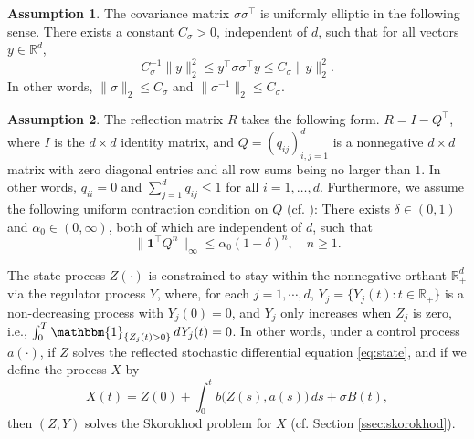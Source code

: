 \documentclass[11pt]{article}
\theoremstyle{definition}
\newtheorem{assumption}{Assumption}[section]
\theoremstyle{plain}
\newcommand{\R}{\mathbb{R}}
\newcommand{\bOne}{\bm{1}}
\begin{document}
\begin{assumption}\label{as:sigma} %
The covariance matrix $\sigma \sigma^{\top}$ is uniformly elliptic in the following sense.  
There exists a constant $C_\sigma > 0$, 
independent of $d$, such that for all vectors $y \in \mathbb{R}^d$,
\[
 C_\sigma^{-1} \|y\|_2^2 \le y^{\top} \sigma \sigma^{\top} y \le C_\sigma \|y\|_2^2.
\]
In other words, $\|\sigma\|_2 \le C_\sigma$ and $\|\sigma^{-1}\|_2 \le C_\sigma$.
\end{assumption}

\begin{assumption}\label{as:R}
The reflection matrix $R$ takes the following form. 
$R = I-Q^{\top}$, where $I$ is the $d\times d$ identity matrix, 
and $Q = (q_{ij})_{i,j=1}^{d}$ is a nonnegative $d \times d$ matrix with zero diagonal entries and all row sums being no larger than $1$. 
In other words, $q_{ii} = 0$ and $\sum_{j=1}^d q_{ij} \le 1$ for all $i = 1,\dots,d$. 
Furthermore, we assume the following uniform contraction condition on $Q$ (cf. \cite{BlanchetChenSiGlynn2021}): There exists $\delta \in (0, 1)$ 
and $\alpha_0 \in (0, \infty)$, both of which are independent of $d$, such that 
\begin{equation}\label{eq:Q-contraction}
\|\bOne^{\top} Q^n\|_\infty \leq \alpha_0 (1-\delta)^n, \quad n\geq 1.
\end{equation}
\end{assumption}
The state process $Z(\cdot)$ is constrained to stay within the nonnegative orthant $\mathbb{R}_+^d$ via the regulator process $Y$, 
where, for each $j = 1, \cdots, d$, $Y_j = \{Y_j(t) : t\in \R_+\}$ is a non-decreasing process with $Y_j(0) = 0$, and $Y_j$ only increases when $Z_j$ is zero, i.e.,
\( \int_0^T \mathbbm{1}_{\{Z_j(t) > 0\}}\,dY_j(t) = 0 \).
In other words, under a control process $a(\cdot)$, if $Z$ solves the reflected stochastic differential equation \eqref{eq:state}, 
and if we define the process $X$ by
\begin{equation}
X(t) = Z(0) + \int_0^t b\bigl(Z(s), a(s)\bigr)\,ds + \sigma B(t), 
\end{equation} 
then $(Z,Y)$ solves the Skorokhod problem for $X$ (cf. Section \ref{ssec:skorokhod}). 
\end{document}
